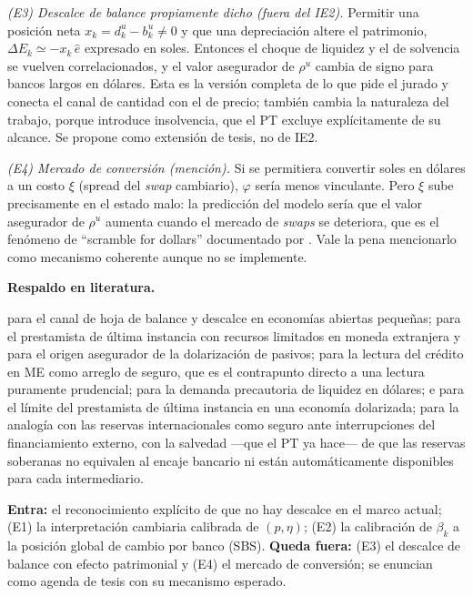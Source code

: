 \documentclass[11pt]{article}
\newcommand{\lit}{\par\noindent\textbf{Respaldo en literatura.}\par}
\theoremstyle{definition}
\begin{document}
\emph{(E3) Descalce de balance propiamente dicho (fuera del IE2).} Permitir una
posici\'on neta $x_k=d^u_k-b^u_k\neq0$ y que una depreciaci\'on altere el
patrimonio, $\Delta E_k\simeq -x_k\,\hat e$ expresado en soles. Entonces el choque
de liquidez y el de solvencia se vuelven correlacionados, y el valor asegurador
de $\rho^u$ cambia de signo para bancos largos en d\'olares. Esta es la versi\'on
completa de lo que pide el jurado y conecta el canal de cantidad con el de
precio; tambi\'en cambia la naturaleza del trabajo, porque introduce insolvencia,
que el PT excluye expl\'icitamente de su alcance. Se propone como extensi\'on de
tesis, no de IE2.

\emph{(E4) Mercado de conversi\'on (menci\'on).} Si se permitiera convertir soles en
d\'olares a un costo $\xi$ (spread del \emph{swap} cambiario), $\varphi$ ser\'ia
menos vinculante. Pero $\xi$ sube precisamente en el estado malo: la predicci\'on
del modelo ser\'ia que el valor asegurador de $\rho^u$ aumenta cuando el mercado
de \emph{swaps} se deteriora, que es el fen\'omeno de ``scramble for dollars''
documentado por \citet{bianchibigioengel2021}. Vale la pena mencionarlo como
mecanismo coherente aunque no se implemente.

\lit
\citet{cespedes2004} para el canal de hoja de balance y descalce en econom\'ias
abiertas peque\~nas; \citet{bocolalorenzoni2020} para el prestamista de \'ultima
instancia con recursos limitados en moneda extranjera y para el origen asegurador
de la dolarizaci\'on de pasivos; \citet{dalgic2024} para la lectura del cr\'edito en
ME como arreglo de seguro, que es el contrapunto directo a una lectura puramente
prudencial; \citet{bianchibigioengel2021} para la demanda precautoria de liquidez
en d\'olares; \citet{levyyeyati2008} e \citet{izelevyyeyati2005} para el l\'imite del
prestamista de \'ultima instancia en una econom\'ia dolarizada;
\citet{jeanneranciere2011} para la analog\'ia con las reservas internacionales como
seguro ante interrupciones del financiamiento externo, con la salvedad ---que el
PT ya hace--- de que las reservas soberanas no equivalen al encaje bancario ni
est\'an autom\'aticamente disponibles para cada intermediario.

\begin{ie2}
\textbf{Entra:} el reconocimiento expl\'icito de que no hay descalce en el marco
actual; (E1) la interpretaci\'on cambiaria calibrada de $(p,\eta)$; (E2) la
calibraci\'on de $\beta_k$ a la posici\'on global de cambio por banco (SBS).
\textbf{Queda fuera:} (E3) el descalce de balance con efecto patrimonial y (E4)
el mercado de conversi\'on; se enuncian como agenda de tesis con su mecanismo
esperado.
\end{ie2}
\end{document}
